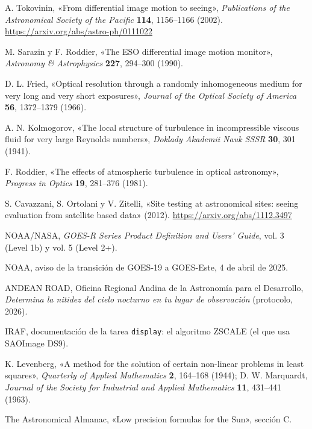 \begin{enumerate}[label={[\arabic*]},leftmargin=*,itemsep=0.5em]
\item A. Tokovinin, «From differential image motion to seeing», \emph{Publications of the Astronomical Society of the
Pacific} \textbf{114}, 1156–1166 (2002). \url{https://arxiv.org/abs/astro-ph/0111022}
\item M. Sarazin y F. Roddier, «The ESO differential image motion monitor», \emph{Astronomy \& Astrophysics}
\textbf{227}, 294–300 (1990).
\item D. L. Fried, «Optical resolution through a randomly inhomogeneous medium for very long and very short exposures»,
\emph{Journal of the Optical Society of America} \textbf{56}, 1372–1379 (1966).
\item A. N. Kolmogorov, «The local structure of turbulence in incompressible viscous fluid for very large Reynolds
numbers», \emph{Doklady Akademii Nauk SSSR} \textbf{30}, 301 (1941).
\item F. Roddier, «The effects of atmospheric turbulence in optical astronomy», \emph{Progress in Optics} \textbf{19},
281–376 (1981).
\item S. Cavazzani, S. Ortolani y V. Zitelli, «Site testing at astronomical sites: seeing evaluation from satellite based
data» (2012). \url{https://arxiv.org/abs/1112.3497}
\item NOAA/NASA, \emph{GOES-R Series Product Definition and Users' Guide}, vol. 3 (Level 1b) y vol. 5 (Level 2+).
\item NOAA, aviso de la transición de GOES-19 a GOES-Este, 4 de abril de 2025.
\item ANDEAN ROAD, Oficina Regional Andina de la Astronomía para el Desarrollo, \emph{Determina la nitidez del cielo
nocturno en tu lugar de observación} (protocolo, 2026).
\item IRAF, documentación de la tarea \texttt{display}: el algoritmo ZSCALE (el que usa SAOImage DS9).
\item K. Levenberg, «A method for the solution of certain non-linear problems in least squares», \emph{Quarterly of
Applied Mathematics} \textbf{2}, 164–168 (1944); D. W. Marquardt, \emph{Journal of the Society for Industrial and Applied
Mathematics} \textbf{11}, 431–441 (1963).
\item The Astronomical Almanac, «Low precision formulas for the Sun», sección C.
\end{enumerate}
